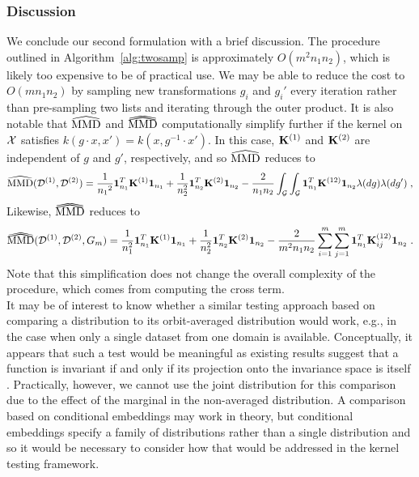 \subsubsection{Discussion} \label{sec:twosamp:disc}

We conclude our second formulation with a brief discussion. The procedure outlined in Algorithm~\ref{alg:twosamp} is approximately $O(m^2n_1n_2)$, which is likely too expensive to be of practical use. We may be able to reduce the cost to $O(mn_1n_2)$ by sampling new transformations $g_i$ and $g_i'$ every iteration rather than pre-sampling two lists and iterating through the outer product. It is also notable that $\widehat{\mathrm{MMD}}$ and $\dhatMMD$ computationally simplify further if the kernel on $\mathcal{X}$ satisfies $k(g\cdot x,x')=k(x,g^{-1}\cdot x')$. In this case, $\mathbf{K}^{(1)}$ and $\mathbf{K}^{(2)}$ are independent of $g$ and $g'$, respectively, and so $\widehat{\mathrm{MMD}}$ reduces to
\[
\widehat{\mathrm{MMD}}(\mathcal{D}^{(1)},\mathcal{D}^{(2)}) = \frac{1}{{n_1}^2}\mathbf{1}_{n_1}^T\mathbf{K}^{(1)}\mathbf{1}_{n_1} + \frac{1}{n_2^2}\mathbf{1}_{n_2}^T\mathbf{K}^{(2)}\mathbf{1}_{n_2} - \frac{2}{n_1n_2}\int_{\mathcal{G}}\int_{\mathcal{G}}\mathbf{1}_{n_1}^T\mathbf{K}^{(12)}\mathbf{1}_{n_2}\lambda(dg)\lambda(dg') \;,
\]
Likewise, $\dhatMMD$ reduces to
\[
\dhatMMD(\calD^{(1)},\calD^{(2)},G_m) = \frac{1}{n_1^2}\onevec_{n_1}^T\bfK^{(1)}\onevec_{n_1} + \frac{1}{n_2^2}\onevec_{n_2}^T\bfK^{(2)}\onevec_{n_2} - \frac{2}{m^2n_1n_2}\sum_{i=1}^m\sum_{j=1}^m\onevec_{n_1}^T\bfK_{ij}^{(12)}\onevec_{n_2} \;.
\]
Note that this simplification does not change the overall complexity of the procedure, which comes from computing the cross term.
\\

It may be of interest to know whether a similar testing approach based on comparing a distribution to its orbit-averaged distribution would work, e.g., in the case when only a single dataset from one domain is available. Conceptually, it appears that such a test would be meaningful as existing results suggest that a function is invariant if and only if its projection onto the invariance space is itself \parencite[Lemma~1]{Elesedy:2021}. Practically, however, we cannot use the joint distribution for this comparison due to the effect of the marginal in the non-averaged distribution. A comparison based on conditional embeddings may work in theory, but conditional embeddings specify a family of distributions rather than a single distribution \parencite{Song:2013} and so it would be necessary to consider how that would be addressed in the kernel testing framework.

\iffalse
\begin{itemize}

\item
Notation: image of $\P_X$ under $g$: $\P_{gX} = \P_{X} \circ g^{-1}$.
\[
\int \P_{gX}(dx) f(x) = \int \P_X(dx) f(gx)
\]

\end{itemize}
\fi


